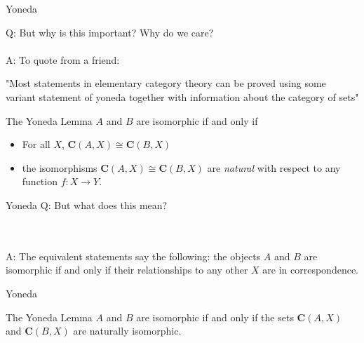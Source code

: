 \documentclass[tikz]{beamer}
\theoremstyle{definition}
\begin{document}
\begin{frame}{Yoneda}
    
Q: But why is this important? Why do we care?
\\
\\
A: To quote from a friend: 
\begin{block}{}
    "Most statements in elementary category theory can be proved using some variant statement of yoneda together with information about the category of sets"
\end{block}{}

\end{frame}
\begin{frame}
    
    
\begin{block}{The Yoneda Lemma}
    $A$ and $B$ are isomorphic if and only if 
    \begin{itemize}
        \item For all $X$, $\mathbf{C}(A, X) \cong \mathbf{C}(B, X)$
        
        \item the isomorphisms $\mathbf{C}(A, X) \cong \mathbf{C}(B, X)$ are \textit{natural} with respect to any function $f : X \to Y$.
    \end{itemize}{}
\end{block}{}



\end{frame}
\begin{frame}{Yoneda}
    Q: But what does this mean? 
    
    \\
    \\
    A: The equivalent statements say the following: the objects $A$ and $B$ are isomorphic if and only if their relationships to any other $X$ are in correspondence.
    
\end{frame}
\begin{frame}{Yoneda}
    \begin{block}{The Yoneda Lemma}
        $A$ and $B$ are isomorphic if and only if the sets $\mathbf{C}(A, X) $ and $\mathbf{C}(B, X)$ are naturally isomorphic.
    \end{block}{}
\end{frame}
\end{document}
